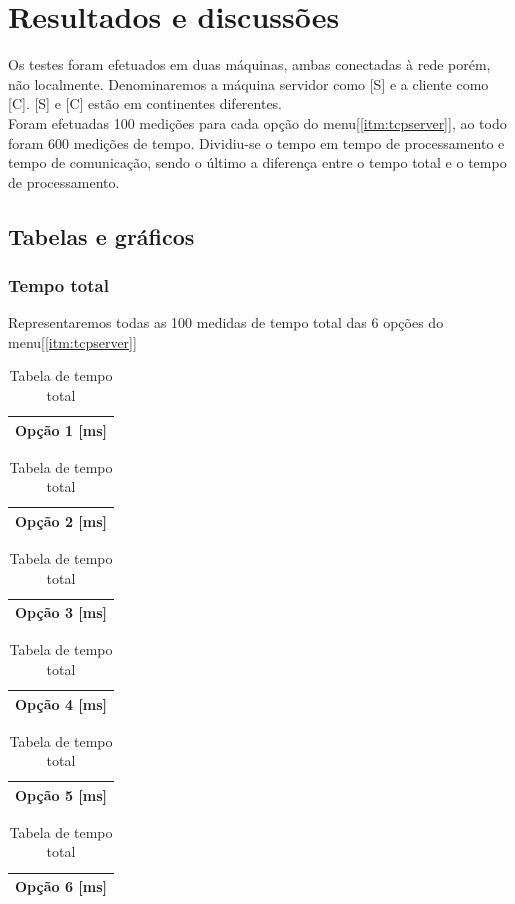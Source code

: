 \documentclass[a4paper,10pt]{article}
\begin{document}
\section{Resultados e discussões}
Os testes foram efetuados em duas máquinas, ambas conectadas à rede porém, não localmente. Denominaremos a máquina servidor como [S] e a cliente como [C]. [S] e [C] estão em continentes diferentes.
\\Foram efetuadas 100 medições para cada opção do menu[\ref{itm:tcpserver}], ao todo foram 600 medições de tempo. Dividiu-se o tempo em tempo de processamento e tempo de comunicação, sendo o último a diferença entre o tempo total e o tempo de processamento.
\subsection{Tabelas e gráficos}
\subsubsection{Tempo total}
Representaremos todas as 100 medidas de tempo total das 6 opções do menu[\ref{itm:tcpserver}]
\addtolength{\abovecaptionskip}{-8pt}
\begin{table}
  \tiny
  \centering
  \begin{tabular}{|c|}
    \hline
    Opção 1 [ms] \\
    \hline
        
    \hline
  \end{tabular}
  \begin{tabular}{|c|}
    \hline
    Opção 2 [ms] \\
    \hline
    
    \hline
  \end{tabular}
  \begin{tabular}{|c|}
    \hline
    Opção 3 [ms] \\
    \hline
    
    \hline
  \end{tabular}
  \begin{tabular}{|c|}
    \hline
    Opção 4 [ms] \\
    \hline
    
    \hline
  \end{tabular}
  \begin{tabular}{|c|}
    \hline
    Opção 5 [ms] \\
    \hline
    
    \hline
  \end{tabular}
  \begin{tabular}{|c|}
    \hline
    Opção 6 [ms] \\
    \hline
    
    \hline
  \end{tabular}
  \caption{Tabela de tempo total}
\end{table}
\newpage
\end{document}
